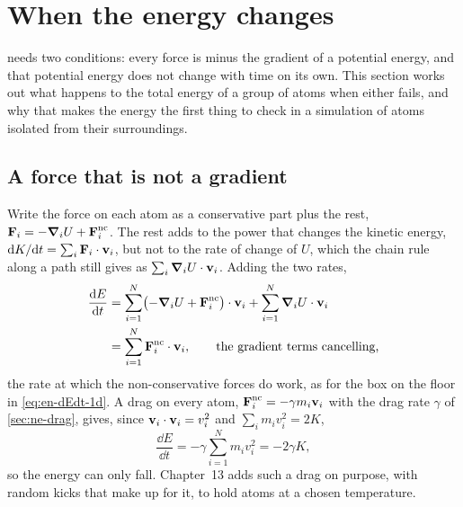 \section{When the energy changes}
\label{sec:en-drift}

 needs two conditions: every force is minus the
gradient of a potential energy, and that potential energy does not change
with time on its own. This section works out what happens to the total
energy of a group of atoms when either fails, and why that makes the
energy the first thing to check in a simulation of atoms isolated from
their surroundings.

\subsection*{A force that is not a gradient}

Write the force on each atom as a conservative part plus the rest,
$\bm{\mathrm{F}}_i = -\bm{\nabla}_i U + \bm{\mathrm{F}}_i^{\mathrm{nc}}$. The rest adds to the
power that changes the kinetic energy, $\mathrm{d} K/\mathrm{d} t = \sum_i\bm{\mathrm{F}}_i
\cdot\bm{\mathrm{v}}_i$, but not to the rate of change of $U$, which the chain rule
along a path still gives as $\sum_i\bm{\nabla}_i U\cdot\bm{\mathrm{v}}_i$. Adding the two
rates,
\begin{align}
   \frac{\mathrm{d} E}{\mathrm{d} t}
   &= \sum_{i=1}^{N}\bigl(-\bm{\nabla}_i U + \bm{\mathrm{F}}_i^{\mathrm{nc}}\bigr)\cdot
      \bm{\mathrm{v}}_i + \sum_{i=1}^{N}\bm{\nabla}_i U\cdot\bm{\mathrm{v}}_i \nonumber\\
   &= \sum_{i=1}^{N}\bm{\mathrm{F}}_i^{\mathrm{nc}}\cdot\bm{\mathrm{v}}_i ,
      \qquad\text{the gradient terms cancelling,}
   \label{eq:en-dEdt}
\end{align}
the rate at which the non-conservative forces do work, as for the box on
the floor in \cref{eq:en-dEdt-1d}. A drag on every atom, $\bm{\mathrm{F}}_i^{
\mathrm{nc}} = -\gamma m_i\bm{\mathrm{v}}_i$ with the drag rate $\gamma$ of
\cref{sec:ne-drag}, gives, since $\bm{\mathrm{v}}_i\cdot\bm{\mathrm{v}}_i = v_i^2$ and
$\sum_i m_i v_i^2 = 2K$,
\begin{equation*}
   \frac{\dd E}{\dd t} = -\gamma\sum_{i=1}^{N} m_i v_i^2 = -2\gamma K ,
\end{equation*}
so the energy can only fall. Chapter~13 adds such a drag on purpose, with
random kicks that make up for it, to hold atoms at a chosen temperature.

